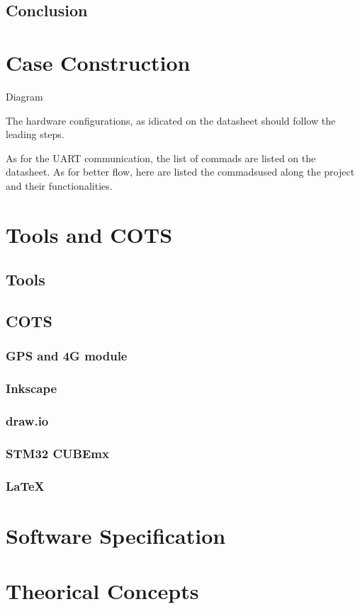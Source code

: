 \subsection{Conclusion}
\section{Case Construction}

Diagram


The hardware configurations, as idicated on the datasheet should follow the leading steps.

As for the UART communication, the list of commads are listed on the datasheet. 
As for better flow, here are listed the commadsused along the project and their functionalities. 



\section{Tools and COTS}
\subsection{Tools}
\subsection{COTS}
\subsubsection{GPS and 4G module}
\subsubsection{Inkscape}
\subsubsection{draw.io}
\subsubsection{STM32 CUBEmx}
\subsubsection{\LaTeX}
\section{Software Specification}
\section{Theorical Concepts}